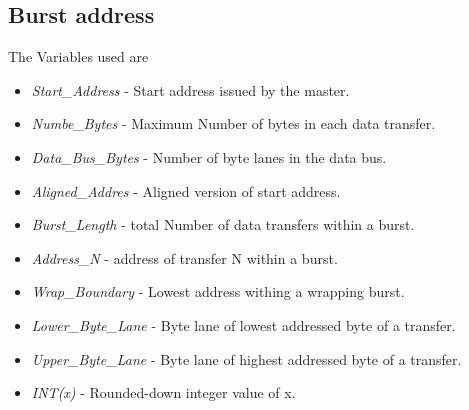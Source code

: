 \documentclass{article}
\begin{document}
\subsection{Burst address}
\quad The Variables used are
\begin{itemize}
    \item \emph{Start\_Address} - Start address issued by the master.
    \item \emph{Numbe\_Bytes} - Maximum Number of bytes in each data transfer.
    \item \emph{Data\_Bus\_Bytes} - Number of byte lanes in the data bus.
    \item \emph{Aligned\_Addres} - Aligned version of start address.
    \item \emph{Burst\_Length} - total Number of data transfers within a burst.
    \item \emph{Address\_N} - address of transfer N within a burst.
    \item \emph{Wrap\_Boundary} - Lowest address withing a wrapping burst.
    \item \emph{Lower\_Byte\_Lane} - Byte lane of lowest addressed byte of a transfer.
    \item \emph{Upper\_Byte\_Lane} - Byte lane of highest addressed byte of a transfer.
    \item \emph{INT(x)} - Rounded-down integer value of x.
\end{itemize}
\end{document}

